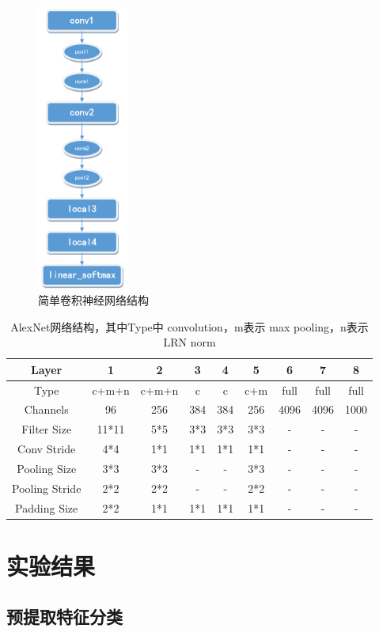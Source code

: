 \begin{figure}[htbp]
\centering
\includegraphics[width=3cm]{resource/Lenet.png}
\caption{简单卷积神经网络结构}
\label{fig:Lenet}
\end{figure}

\begin{table}[htbp]
\centering
\begin{tabular}{ccccccccc}
\hline
Layer & \textbf{1} & \textbf{2} & \textbf{3} & \textbf{4} & \textbf{5} & \textbf{6} & \textbf{7} & \textbf{8} \\
\hline
Type & c+m+n & c+m+n & c & c & c+m & full & full & full \\
Channels & 96 & 256 & 384 & 384 & 256 & 4096 & 4096 & 1000 \\
Filter Size & 11*11 & 5*5 & 3*3 & 3*3 & 3*3 & - & - & - \\
Conv Stride & 4*4 & 1*1 & 1*1 & 1*1 & 1*1 & - & - & - \\
Pooling Size & 3*3 & 3*3 & - & - & 3*3 & - & - & - \\
Pooling Stride & 2*2 & 2*2 & - & - & 2*2 & - & - & - \\
Padding Size & 2*2 & 1*1 & 1*1 & 1*1 & 1*1 & - & - & - \\
\hline
\end{tabular}
\caption{AlexNet网络结构，其中Type中 convolution，m表示 max pooling，n表示 LRN norm}
\label{tab:AlexNet}
\end{table}

\section{实验结果}
\subsection{预提取特征分类}

